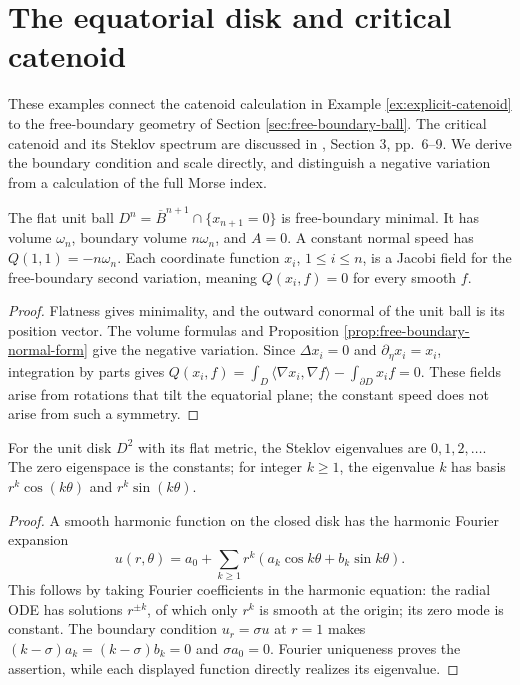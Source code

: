 \chapter{The equatorial disk and critical catenoid}\label{sec:examples-free-boundary}
These examples connect the catenoid calculation in Example \ref{ex:explicit-catenoid} to the free-boundary geometry of Section \ref{sec:free-boundary-ball}. The critical catenoid and its Steklov spectrum are discussed in \cite{FS11}, Section 3, pp.~6--9. We derive the boundary condition and scale directly, and distinguish a negative variation from a calculation of the full Morse index.

\begin{example}\label{ex:equatorial-free-boundary-ball}
The flat unit ball $D^n=\overline B^{n+1}\cap\{x_{n+1}=0\}$ is free-boundary minimal. It has volume $\omega_n$, boundary volume $n\omega_n$, and $A=0$. A constant normal speed has $Q(1,1)=-n\omega_n$. Each coordinate function $x_i$, $1\leq i\leq n$, is a Jacobi field for the free-boundary second variation, meaning $Q(x_i,f)=0$ for every smooth $f$.
\end{example}
\begin{proof}
Flatness gives minimality, and the outward conormal of the unit ball is its position vector. The volume formulas and Proposition \ref{prop:free-boundary-normal-form} give the negative variation. Since $\Delta x_i=0$ and $\partial_\eta x_i=x_i$, integration by parts gives
$Q(x_i,f)=\int_D\langle\nabla x_i,\nabla f\rangle-\int_{\partial D}x_if=0$.
These fields arise from rotations that tilt the equatorial plane; the constant speed does not arise from such a symmetry.
\end{proof}

\begin{proposition}\label{prop:disk-steklov-spectrum}
For the unit disk $D^2$ with its flat metric, the Steklov eigenvalues are $0,1,2,\ldots$. The zero eigenspace is the constants; for integer $k\geq1$, the eigenvalue $k$ has basis $r^k\cos(k\theta)$ and $r^k\sin(k\theta)$.
\end{proposition}
\begin{proof}
A smooth harmonic function on the closed disk has the harmonic Fourier expansion
\[
 u(r,\theta)=a_0+\sum_{k\geq1}r^k(a_k\cos k\theta+b_k\sin k\theta).
\]
This follows by taking Fourier coefficients in the harmonic equation: the radial ODE has solutions $r^{\pm k}$, of which only $r^k$ is smooth at the origin; its zero mode is constant. The boundary condition $u_r=\sigma u$ at $r=1$ makes $(k-\sigma)a_k=(k-\sigma)b_k=0$ and $\sigma a_0=0$. Fourier uniqueness proves the assertion, while each displayed function directly realizes its eigenvalue.
\end{proof}

